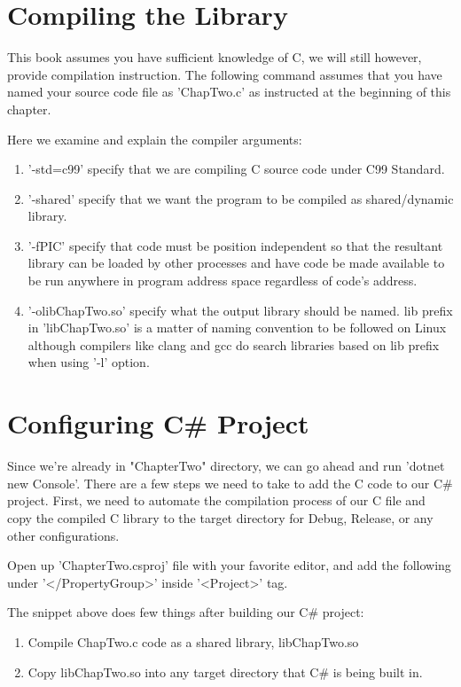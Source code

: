 \section{Compiling the Library}
This book assumes you have sufficient knowledge of C, we will still however, provide compilation instruction. The following command assumes that you have named your source code file as 'ChapTwo.c' as instructed at the beginning of this chapter.



Here we examine and explain the compiler arguments:

\begin{enumerate}
	\item '-std=c99' specify that we are compiling C source code under C99 Standard.
	\item '-shared' specify that we want the program to be compiled as shared/dynamic library.
	\item '-fPIC' specify that code must be position independent so that the resultant library can be loaded by other processes and have code be made available to be run anywhere in program address space regardless of code's address.
	\item '-olibChapTwo.so' specify what the output library should be named. lib prefix in 'libChapTwo.so' is a matter of naming convention to be followed on Linux although compilers like clang and gcc do search libraries based on lib prefix when using '-l' option. 
\end{enumerate}
\newpage
\section{Configuring C\# Project}
Since we're already in "ChapterTwo" directory, we can go ahead and run 'dotnet new Console'. There are a few steps we need to take to add the C code to our C\# project. First, we need to automate the compilation process of our C file and copy the compiled C library to the target directory for Debug, Release, or any other configurations.

Open up 'ChapterTwo.csproj' file with your favorite editor, and add the following under '</PropertyGroup>' inside '<Project>' tag.



The snippet above does few things after building our C\# project:
\begin{enumerate}
	\item Compile ChapTwo.c code as a shared library, libChapTwo.so
	\item Copy libChapTwo.so into any target directory that C\# is being built in.
\end{enumerate}

